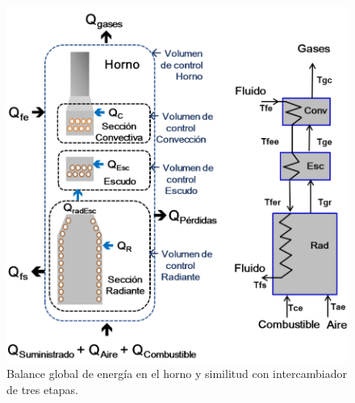\begin{figure}[hbt]
\begin{center}
\includegraphics[scale=0.38]{images/balance-energic}
\caption[Balance de energía del horno]{Balance global de energía en el horno y similitud con intercambiador de tres etapas.}
\label{fig:balance-energic}
\end{center}
\end{figure}

